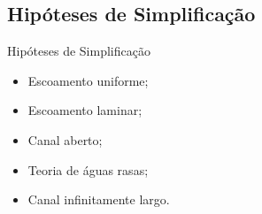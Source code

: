 \subsection{Hipóteses de Simplificação}

\begin{frame}
    \begin{exampleblock}{Hipóteses de Simplificação}
        \begin{itemize}
            \item Escoamento uniforme;
            \item Escoamento laminar;
            \item Canal aberto;
            \item Teoria de águas rasas;
            \item Canal infinitamente largo.
        \end{itemize}
    \end{exampleblock}
\end{frame}
